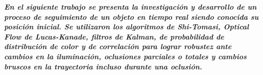 \textbf{\textit{En el siguiente trabajo se presenta la investigación y desarrollo de un proceso de seguimiento de un objeto en tiempo real siendo conocida su posición inicial. Se utilizaron los algoritmos de Shi-Tomasi, Optical Flow de Lucas-Kanade, filtros de Kalman, de probabilidad de distribución de color y de correlación para lograr robustez ante cambios en la iluminación, oclusiones parciales o totales y cambios bruscos en la trayectoria incluso durante una oclusión.}}